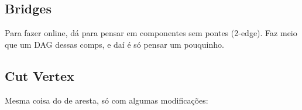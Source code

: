 \subsection{Bridges}


Para fazer online, dá para pensar em componentes sem pontes (2-edge). Faz meio que um DAG dessas comps, e daí é só pensar um pouquinho.

\subsection{Cut Vertex}

Mesma coisa do de aresta, só com algumas modificações:


